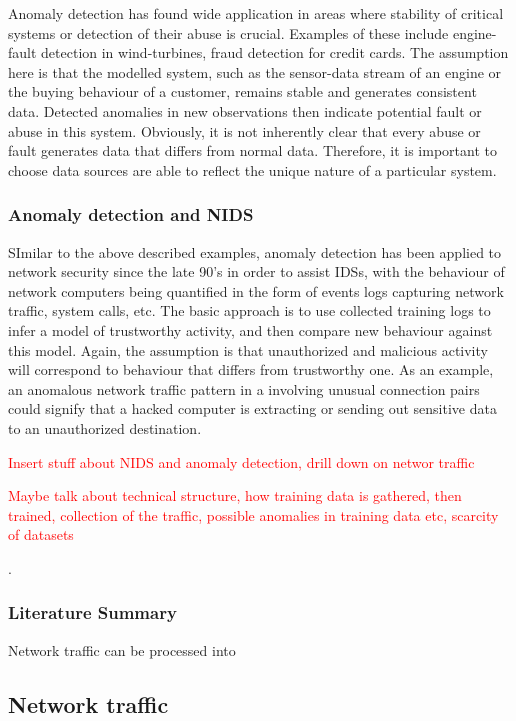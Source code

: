 \documentclass[a4paper,12pt,twoside]{report}
\begin{document}
Anomaly detection has found wide application in areas where stability of  critical systems or detection of their abuse is crucial. Examples of these include engine-fault detection in wind-turbines, fraud detection for credit cards. The assumption here is that the modelled system, such as the sensor-data stream of an engine or the buying behaviour of a customer, remains stable and generates consistent data. Detected anomalies in new observations then indicate potential fault or abuse in this system. Obviously, it is not inherently clear that every abuse or fault generates data that differs from normal data. Therefore, it is important to choose data sources are able to reflect the unique nature of a particular system.

\subsubsection{Anomaly detection and NIDS}

SImilar to the above described examples, anomaly detection has been applied to network security since the late 90's in order to assist IDSs, with the behaviour of network computers being quantified in the form of events logs capturing network traffic, system calls, etc. The basic approach is to use collected training logs to infer a model of trustworthy activity, and then compare new behaviour against this model. Again, the assumption is that unauthorized and malicious activity will correspond to behaviour that differs from trustworthy one. As an example, an anomalous network traffic pattern in a involving unusual connection pairs could
signify that a hacked computer is extracting or sending out sensitive data to an unauthorized destination.

\textcolor{red}{Insert stuff about NIDS and anomaly detection, drill down on networ traffic

Maybe talk about technical structure, how training data is gathered, then trained, collection of the traffic, possible anomalies in training data etc, scarcity of datasets}.

\subsubsection{Literature Summary}

Network traffic can be processed into 



\subsection{Network traffic}
\end{document}
